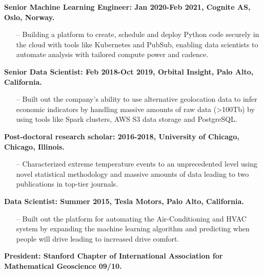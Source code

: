 \documentclass[letterpaper, 12pt]{article}
\renewenvironment{itemize}{
  \begin{list}{}{
    \setlength{\leftmargin}{1.5em}
  }
}{
  \end{list}
}
\begin{document}
\begin{itemize}
  \item \textbf{Senior Machine Learning Engineer: Jan 2020-Feb 2021, Cognite AS, Oslo, Norway. }
  \begin{enumerate}
       \item[--] Building a platform to create, schedule and deploy Python code securely in the cloud with tools like Kubernetes and PubSub, enabling data scientists to automate analysis with tailored compute power and cadence.
   \end{enumerate}
  \item \textbf{Senior Data Scientist: Feb 2018-Oct 2019, Orbital Insight, Palo Alto, California. }
  \begin{enumerate}
       \item[--] Built out the company's ability to use alternative geolocation data to infer economic indicators by handling massive amounts of raw data (>100Tb) by using tools like Spark clusters, AWS S3 data storage and PostgreSQL.
   \end{enumerate}
  \newpage
  \item \textbf{Post-doctoral research scholar: 2016-2018, University of Chicago, Chicago, Illinois.}
  \begin{enumerate}
       \item[--] Characterized extreme temperature events to an unprecedented level using novel statistical methodology and massive amounts of data leading to two publications in top-tier journals. 
   \end{enumerate}
  \item \textbf{Data Scientist: Summer 2015, Tesla Motors, Palo Alto, California.}
  \begin{enumerate}
       \item[--] Built out the platform for automating the Air-Conditioning and HVAC system by expanding the machine learning algorithm and predicting when people will drive leading to increased drive comfort.
   \end{enumerate}
  \item \textbf{President: Stanford Chapter of International Association
          for Mathematical Geoscience 09/10.}
\end{itemize}
\end{document}
